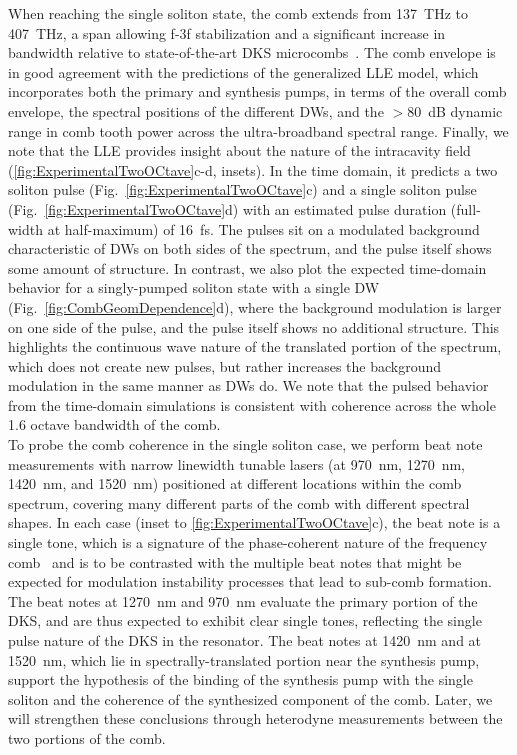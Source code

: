 \documentclass[reprint,superscriptaddress, amsmath,amssymb,pra, aps,floatfix,longbibliography]{revtex4-1}
\begin{document}
When reaching the single soliton state, the comb extends from 137~THz to 407~THz, a span allowing f-3f stabilization  and a significant increase in bandwidth relative to state-of-the-art DKS microcombs~\cite{spencer_optical-frequency_2018,yu_tuning_2019}. The comb envelope is in good agreement with the predictions of the generalized LLE model, which incorporates both the primary and synthesis pumps, in terms of the overall comb envelope, the spectral positions of the different DWs, and the $>$80~dB dynamic range in comb tooth power across the ultra-broadband spectral range. Finally, we note that the LLE provides insight about the nature of the intracavity field (\cref{fig:ExperimentalTwoOCtave}c-d, insets). In the time domain, it predicts a two soliton pulse (Fig.~\ref{fig:ExperimentalTwoOCtave}c) and a single soliton pulse (Fig.~\ref{fig:ExperimentalTwoOCtave}d) with an estimated pulse duration (full-width at half-maximum) of 16~fs. The pulses sit on a modulated background characteristic of DWs on both sides of the spectrum, and the pulse itself shows some amount of structure. In contrast, we also plot the expected time-domain behavior for a singly-pumped soliton state with a single DW (Fig.~\ref{fig:CombGeomDependence}d), where the background modulation is larger on one side of the pulse, and the pulse itself shows no additional structure. This highlights the continuous wave nature of the translated portion of the spectrum, which does not create new pulses, but rather increases the background modulation in the same manner as DWs do. We note that the pulsed behavior from the time-domain simulations is consistent with coherence across the whole 1.6 octave bandwidth of the comb. \\
{\indent}To probe the comb coherence in the single soliton case, we perform beat note measurements with narrow linewidth tunable lasers (at 970~nm, 1270~nm, 1420~nm, and 1520~nm) positioned at different locations within the comb spectrum, covering many different parts of the comb with different spectral shapes. In each case (inset to \cref{fig:ExperimentalTwoOCtave}c), the beat note is a single tone, which is a signature of the phase-coherent nature of the frequency comb~\cite{herr_universal_2012, raja_electrically_2019} and is to be contrasted with the multiple beat notes that might be expected for modulation instability processes that lead to sub-comb formation. The beat notes at 1270~nm and 970~nm evaluate the primary portion of the DKS, and are thus expected to exhibit clear single tones, reflecting the single pulse nature of the DKS in the resonator. The beat notes at 1420~nm and at 1520~nm, which lie in spectrally-translated portion near the synthesis pump, support the hypothesis of the binding of the synthesis pump with the single soliton and the coherence of the synthesized component of the comb. Later, we will strengthen these conclusions through heterodyne measurements between the two portions of the comb.\\
\end{document}
